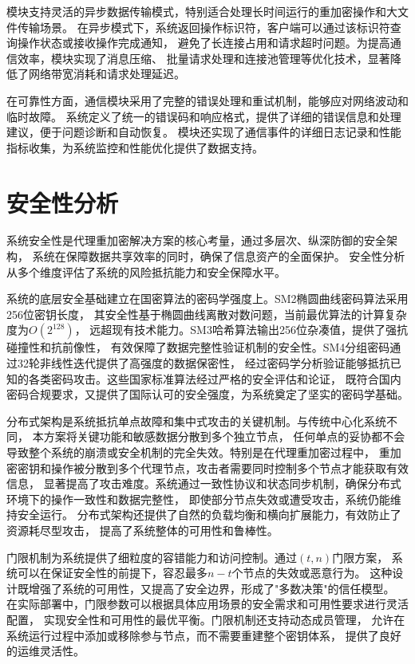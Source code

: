 模块支持灵活的异步数据传输模式，特别适合处理长时间运行的重加密操作和大文件传输场景。
在异步模式下，系统返回操作标识符，客户端可以通过该标识符查询操作状态或接收操作完成通知，
避免了长连接占用和请求超时问题。为提高通信效率，模块实现了消息压缩、
批量请求处理和连接池管理等优化技术，显著降低了网络带宽消耗和请求处理延迟。

在可靠性方面，通信模块采用了完整的错误处理和重试机制，能够应对网络波动和临时故障。
系统定义了统一的错误码和响应格式，提供了详细的错误信息和处理建议，便于问题诊断和自动恢复。
模块还实现了通信事件的详细日志记录和性能指标收集，为系统监控和性能优化提供了数据支持。

\section{安全性分析}
系统安全性是代理重加密解决方案的核心考量，通过多层次、纵深防御的安全架构，
系统在保障数据共享效率的同时，确保了信息资产的全面保护。
安全性分析从多个维度评估了系统的风险抵抗能力和安全保障水平。

系统的底层安全基础建立在国密算法的密码学强度上。SM2椭圆曲线密码算法采用256位密钥长度，
其安全性基于椭圆曲线离散对数问题，当前最优算法的计算复杂度为$O(2^{128})$，
远超现有技术能力。SM3哈希算法输出256位杂凑值，提供了强抗碰撞性和抗前像性，
有效保障了数据完整性验证机制的安全性。SM4分组密码通过32轮非线性迭代提供了高强度的数据保密性，
经过密码学分析验证能够抵抗已知的各类密码攻击。这些国家标准算法经过严格的安全评估和论证，
既符合国内密码合规要求，又提供了国际认可的安全强度，为系统奠定了坚实的密码学基础。

分布式架构是系统抵抗单点故障和集中式攻击的关键机制。与传统中心化系统不同，
本方案将关键功能和敏感数据分散到多个独立节点，
任何单点的妥协都不会导致整个系统的崩溃或安全机制的完全失效。特别是在代理重加密过程中，
重加密密钥和操作被分散到多个代理节点，攻击者需要同时控制多个节点才能获取有效信息，
显著提高了攻击难度。系统通过一致性协议和状态同步机制，确保分布式环境下的操作一致性和数据完整性，
即使部分节点失效或遭受攻击，系统仍能维持安全运行。
分布式架构还提供了自然的负载均衡和横向扩展能力，有效防止了资源耗尽型攻击，
提高了系统整体的可用性和鲁棒性。

门限机制为系统提供了细粒度的容错能力和访问控制。通过$(t,n)$门限方案，
系统可以在保证安全性的前提下，容忍最多$n-t$个节点的失效或恶意行为。
这种设计既增强了系统的可用性，又提高了安全边界，形成了"多数决策"的信任模型。
在实际部署中，门限参数可以根据具体应用场景的安全需求和可用性要求进行灵活配置，
实现安全性和可用性的最优平衡。门限机制还支持动态成员管理，
允许在系统运行过程中添加或移除参与节点，而不需要重建整个密钥体系，
提供了良好的运维灵活性。

